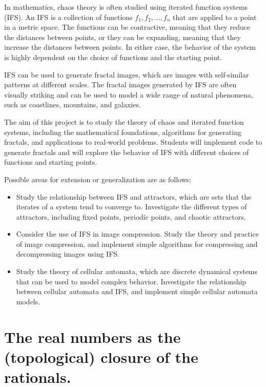\documentclass{article}
\begin{document}
    \vspace{3mm}
    In mathematics, chaos theory is often studied using iterated function systems (IFS). An IFS is a collection of functions $f_1, f_2, ..., f_n$ that are applied to a point in a metric space. The functions can be contractive, meaning that they reduce the distances between points, or they can be expanding, meaning that they increase the distances between points. In either case, the behavior of the system is highly dependent on the choice of functions and the starting point.
    
    \vspace{3mm}
    IFS can be used to generate fractal images, which are images with self-similar patterns at different scales. The fractal images generated by IFS are often visually striking and can be used to model a wide range of natural phenomena, such as coastlines, mountains, and galaxies.
    
    \vspace{3mm}
    The aim of this project is to study the theory of chaos and iterated function systems, including the mathematical foundations, algorithms for generating fractals, and applications to real-world problems. Students will implement code to generate fractals and will explore the behavior of IFS with different choices of functions and starting points.
    
    \vspace{3mm}
    Possible areas for extension or generalization are as follows:
    \begin{itemize}
        \item Study the relationship between IFS and attractors, which are sets that the iterates of a system tend to converge to. Investigate the different types of attractors, including fixed points, periodic points, and chaotic attractors.
        \item Consider the use of IFS in image compression. Study the theory and practice of image compression, and implement simple algorithms for compressing and decompressing images using IFS.
        \item Study the theory of cellular automata, which are discrete dynamical systems that can be used to model complex behavior. Investigate the relationship between cellular automata and IFS, and implement simple cellular automata models.
    \end{itemize}


\pagebreak

\section{The real numbers as the (topological) closure of the rationals.}
\end{document}
